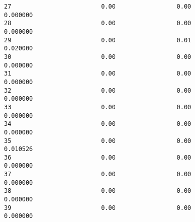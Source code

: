 \documentclass[11pt]{article}
\begin{document}
\begin{tcolorbox}[breakable, size=fbox, boxrule=.5pt, pad at break*=1mm, opacityfill=0]
\begin{Verbatim}[commandchars=\\\{\}]
27                         0.00                 0.00           0.000000
28                         0.00                 0.00           0.000000
29                         0.00                 0.01           0.020000
30                         0.00                 0.00           0.000000
31                         0.00                 0.00           0.000000
32                         0.00                 0.00           0.000000
33                         0.00                 0.00           0.000000
34                         0.00                 0.00           0.000000
35                         0.00                 0.00           0.010526
36                         0.00                 0.00           0.000000
37                         0.00                 0.00           0.000000
38                         0.00                 0.00           0.000000
39                         0.00                 0.00           0.000000


\end{Verbatim}
\end{tcolorbox}
\end{document}

